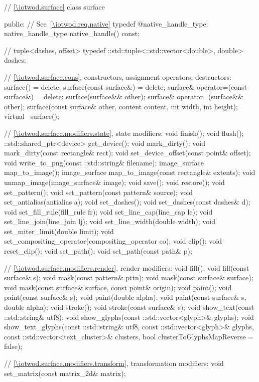 \begin{codeblock}
{{{{  // \ref{\iotwod.surface}
  class surface {
  public:
    // See~\ref{\iotwod.req.native}
    typedef @\impdef@ native_handle_type;
    native_handle_type native_handle() const;

    // tuple<dashes, offset>
    typedef ::std::tuple<::std::vector<double>, double> dashes;

    // \ref{\iotwod.surface.cons}, constructors, assignment operators, destructors:
    surface() = delete;
    surface(const surface&) = delete;
    surface& operator=(const surface&) = delete;
    surface(surface&& other);
    surface& operator=(surface&& other);
    surface(const surface& other, content content, int width, int height);
    virtual ~surface();

    // \ref{\iotwod.surface.modifiers.state}, state modifiers:
    void finish();
    void flush();
    ::std::shared_ptr<device> get_device();
    void mark_dirty();
    void mark_dirty(const rectangle& rect);
    void set_device_offset(const point& offset);
    void write_to_png(const ::std::string& filename);
    image_surface map_to_image();
    image_surface map_to_image(const rectangle& extents);
    void unmap_image(image_surface& image);
    void save();
    void restore();
    void set_pattern();
    void set_pattern(const pattern& source);
    void set_antialias(antialias a);
    void set_dashes();
    void set_dashes(const dashes& d);
    void set_fill_rule(fill_rule fr);
    void set_line_cap(line_cap lc);
    void set_line_join(line_join lj);
    void set_line_width(double width);
    void set_miter_limit(double limit);
    void set_compositing_operator(compositing_operator co);
    void clip();
    void reset_clip();
    void set_path();
    void set_path(const path& p);

    // \ref{\iotwod.surface.modifiers.render}, render modifiers:
    void fill();
    void fill(const surface& s);
    void mask(const pattern& pttn);
    void mask(const surface& surface);
    void mask(const surface& surface, const point& origin);
    void paint();
    void paint(const surface& s);
    void paint(double alpha);
    void paint(const surface& s, double alpha);
    void stroke();
    void stroke(const surface& s);
    void show_text(const ::std::string& utf8);
    void show_glyphs(const ::std::vector<glyph>& glyphs);
    void show_text_glyphs(const ::std::string& utf8,
      const ::std::vector<glyph>& glyphs,
      const ::std::vector<text_cluster>& clusters, 
      bool clusterToGlyphsMapReverse = false);

    // \ref{\iotwod.surface.modifiers.transform}, transformation modifiers:
    void set_matrix(const matrix_2d& matrix);

}}}}}
\end{codeblock}
